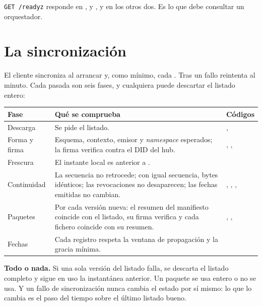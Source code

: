 \medskip
\texttt{GET /\allowbreak{}readyz} responde  en ,  y , y  en los otros
dos. Es lo que debe consultar un orquestador.

\section{La sincronización}

El cliente sincroniza al arrancar y, como mínimo, cada . Tras un fallo reintenta al minuto.
Cada pasada son seis fases, y cualquiera puede descartar el listado entero:

\noindent\begin{tabularx}{\linewidth}{@{}L{2.2cm}Y L{5.7cm}@{}}
\toprule
\textbf{Fase} & \textbf{Qué se comprueba} & \textbf{Códigos} \\
\midrule
Descarga & Se pide el listado. & ,  \\
Forma y firma & Esquema, contexto, emisor y \emph{namespace} esperados; la firma verifica contra el DID del hub. & , ,  \\
Frescura & El instante local es anterior a . &  \\
Continuidad & La secuencia no retrocede; con igual secuencia, bytes idénticos; las revocaciones no desaparecen; las fechas emitidas no cambian. & , , ,  \\
Paquetes & Por cada versión nueva: el resumen del manifiesto coincide con el listado, su firma verifica y cada fichero coincide con su resumen. & , ,  \\
Fechas & Cada registro respeta la ventana de propagación y la gracia mínima. &  \\
\bottomrule
\end{tabularx}

\begin{ideaClave}
\textbf{Todo o nada.} Si una sola versión del listado falla, se descarta el listado completo y sigue en uso la
instantánea anterior. Un paquete se usa entero o no se usa. Y un fallo de sincronización nunca cambia el estado
por sí mismo: lo que lo cambia es el paso del tiempo sobre el último listado bueno.
\end{ideaClave}

